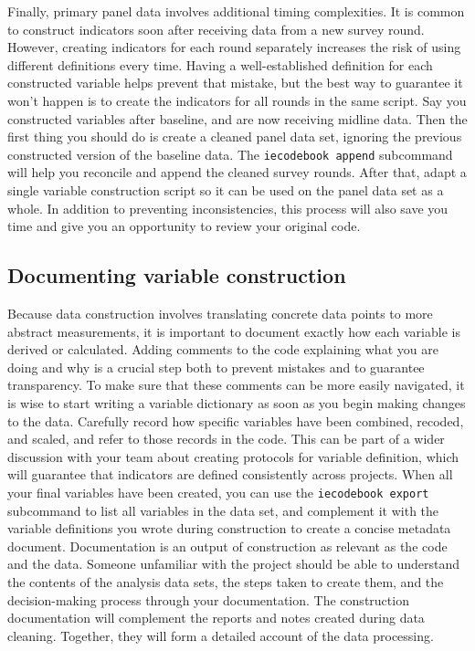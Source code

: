 Finally, primary panel data involves additional timing complexities.
It is common to construct indicators soon after receiving data from a new survey round.
However, creating indicators for each round separately increases the risk of using different definitions every time.
Having a well-established definition for each constructed variable helps prevent that mistake,
but the best way to guarantee it won't happen is to create the indicators for all rounds in the same script.
Say you constructed variables after baseline, and are now receiving midline data.
Then the first thing you should do is create a cleaned panel data set,
ignoring the previous constructed version of the baseline data.
The \texttt{iecodebook append} subcommand will help you reconcile and append the cleaned survey rounds.
After that, adapt a single variable construction script so it can be used on the panel data set as a whole.
In addition to preventing inconsistencies,
this process will also save you time and give you an opportunity to review your original code.

\subsection{Documenting variable construction}

Because data construction involves translating concrete data points to more abstract measurements,
it is important to document exactly how each variable is derived or calculated.
Adding comments to the code explaining what you are doing and why is a crucial step both to prevent mistakes and to guarantee transparency.
To make sure that these comments can be more easily navigated,
it is wise to start writing a variable dictionary as soon as you begin making changes to the data.
Carefully record how specific variables have been combined, recoded, and scaled,
and refer to those records in the code.
This can be part of a wider discussion with your team about creating protocols for variable definition,
which will guarantee that indicators are defined consistently across projects.
When all your final variables have been created,
you can use the \texttt{iecodebook export} subcommand to list all variables in the data set,
and complement it with the variable definitions you wrote during construction to create a concise metadata document.
Documentation is an output of construction as relevant as the code and the data.
Someone unfamiliar with the project should be able to understand the contents of the analysis data sets,
the steps taken to create them,
and the decision-making process through your documentation.
The construction documentation will complement the reports and notes created during data cleaning.
Together, they will form a detailed account of the data processing.


